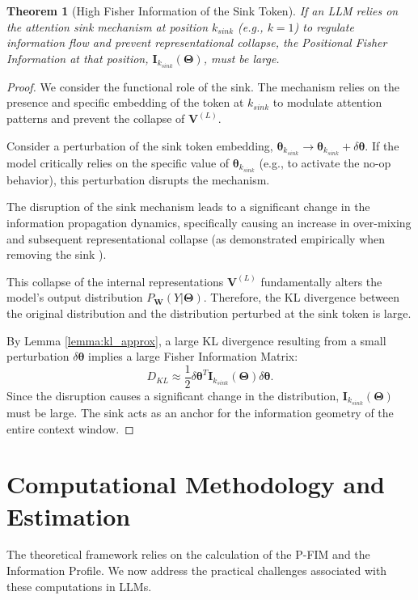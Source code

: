 \documentclass{article}
\newtheorem{theorem}{Theorem}[section]
\theoremstyle{definition}
\begin{document}
\begin{theorem}[High Fisher Information of the Sink Token]
If an LLM relies on the attention sink mechanism at position $k_{sink}$ (e.g., $k=1$) to regulate information flow and prevent representational collapse, the Positional Fisher Information at that position, $\mathbf{I}_{k_{sink}}(\mathbf{\Theta})$, must be large.
\end{theorem}
\begin{proof}
We consider the functional role of the sink. The mechanism relies on the presence and specific embedding of the token at $k_{sink}$ to modulate attention patterns and prevent the collapse of $\mathbf{V}^{(L)}$.

Consider a perturbation of the sink token embedding, $\boldsymbol{\theta}_{k_{sink}} \to \boldsymbol{\theta}_{k_{sink}} + \delta\boldsymbol{\theta}$. If the model critically relies on the specific value of $\boldsymbol{\theta}_{k_{sink}}$ (e.g., to activate the no-op behavior), this perturbation disrupts the mechanism.

The disruption of the sink mechanism leads to a significant change in the information propagation dynamics, specifically causing an increase in over-mixing and subsequent representational collapse (as demonstrated empirically when removing the sink \cite{barbero2025sinks}).

This collapse of the internal representations $\mathbf{V}^{(L)}$ fundamentally alters the model's output distribution $P_{\mathbf{W}}(Y|\mathbf{\Theta})$. Therefore, the KL divergence between the original distribution and the distribution perturbed at the sink token is large.

By Lemma \ref{lemma:kl_approx}, a large KL divergence resulting from a small perturbation $\delta\boldsymbol{\theta}$ implies a large Fisher Information Matrix:
\begin{equation}
    D_{KL} \approx \frac{1}{2} \delta\boldsymbol{\theta}^T \mathbf{I}_{k_{sink}}(\mathbf{\Theta}) \delta\boldsymbol{\theta}.
\end{equation}
Since the disruption causes a significant change in the distribution, $\mathbf{I}_{k_{sink}}(\mathbf{\Theta})$ must be large. The sink acts as an anchor for the information geometry of the entire context window.
\end{proof}

\section{Computational Methodology and Estimation}
\label{sec:computation}
The theoretical framework relies on the calculation of the P-FIM and the Information Profile. We now address the practical challenges associated with these computations in LLMs.
\end{document}
